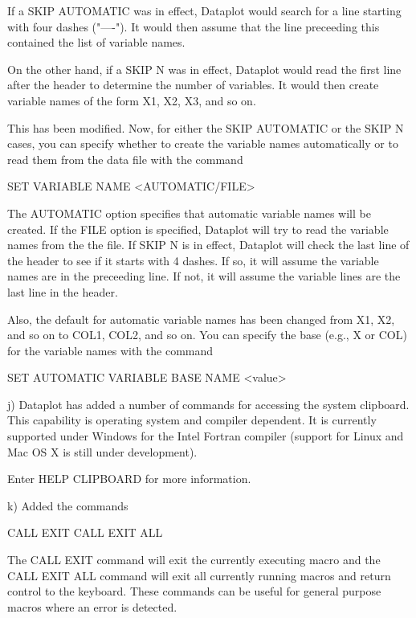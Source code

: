 {             If a SKIP AUTOMATIC was in effect, Dataplot would search
             for a line starting with four dashes ("----").  It would
             then assume that the line preceeding this contained the
             list of variable names.

             On the other hand, if a SKIP N was in effect, Dataplot
             would read the first line after the header to determine
             the number of variables.  It would then create variable
             names of the form X1, X2, X3, and so on.

             This has been modified. Now, for either the
             SKIP AUTOMATIC or the SKIP N cases, you can specify
             whether to create the variable names automatically
             or to read them from the data file with the command

                SET VARIABLE NAME <AUTOMATIC/FILE>

             The AUTOMATIC option specifies that automatic variable
             names will be created.  If the FILE option is specified,
             Dataplot will try to read the variable names from the
             the file.  If SKIP N is in effect, Dataplot will check
             the last line of the header to see if it starts with
             4 dashes.  If so, it will assume the variable names
             are in the preceeding line.  If not, it will assume the
             variable lines are the last line in the header.

             Also, the default for automatic variable names has been
             changed from X1, X2, and so on to COL1, COL2, and so on.
             You can specify the base (e.g., X or COL) for the variable
             names with the command

                 SET AUTOMATIC VARIABLE BASE NAME <value>

    j) Dataplot has added a number of commands for accessing the system
       clipboard.  This capability is operating system and compiler
       dependent.  It is currently supported under Windows for the
       Intel Fortran compiler (support for Linux and Mac OS X is
       still under development).

       Enter HELP CLIPBOARD for more information.

    k) Added the commands

         CALL EXIT
         CALL EXIT ALL

       The CALL EXIT command will exit the currently executing macro
       and the CALL EXIT ALL command will exit all currently running
       macros and return control to the keyboard.  These commands can be
       useful for general purpose macros where an error is detected.

}
